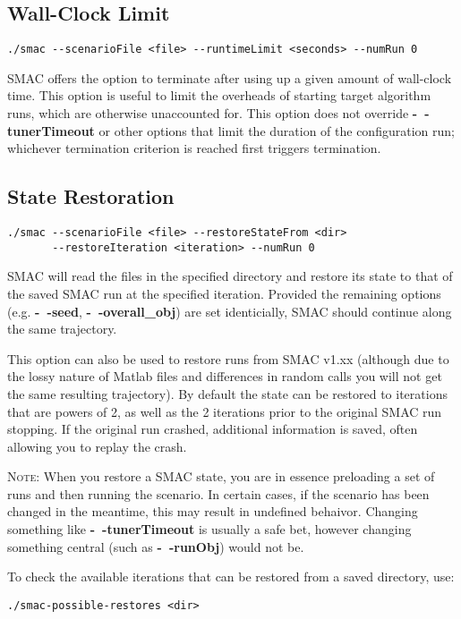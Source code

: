 \subsection{Wall-Clock Limit}\label{sec:wall-clock}
\begin{verbatim}
./smac --scenarioFile <file> --runtimeLimit <seconds> --numRun 0
\end{verbatim}
SMAC offers the option to terminate after using up a given amount of wall-clock time. This option is useful to limit the overheads of starting target algorithm runs, which are otherwise unaccounted for.
This option does not override \textbf{-~$\!$-tunerTimeout} or other options that limit the duration of the configuration run; whichever termination criterion is reached first triggers termination. 

\subsection{State Restoration}\label{sec:state-restoration}
\begin{verbatim}
./smac --scenarioFile <file> --restoreStateFrom <dir> 
       --restoreIteration <iteration> --numRun 0
\end{verbatim}
SMAC will read the files in the specified directory and restore 
its state to that of the saved SMAC run at the specified iteration.
Provided the remaining options (e.g. \textbf{-~$\!$-seed}, \textbf{-~$\!$-overall\_obj}) are set identicially, SMAC should continue along the same trajectory.

This option can also be used to restore runs from SMAC v1.xx (although due to the lossy nature of Matlab files and differences in random calls you will not get the same resulting trajectory). By default the state can be restored to iterations that are powers of 2, as well as the 2 iterations prior to the original SMAC run stopping. 
If the original run crashed, additional information is saved, often allowing you to replay the crash.

\textsc{Note:} When you restore a SMAC state, you are in essence preloading a set of runs and then running the scenario. In certain cases, if the scenario has been changed in the meantime, this may result in undefined behaivor. Changing something like \textbf{-~$\!$-tunerTimeout} is usually a safe bet, however changing something central (such as \textbf{-~$\!$-runObj}) would not be.

To check the available iterations that can be restored from a saved
directory, use:
\begin{verbatim}
./smac-possible-restores <dir>
\end{verbatim}

